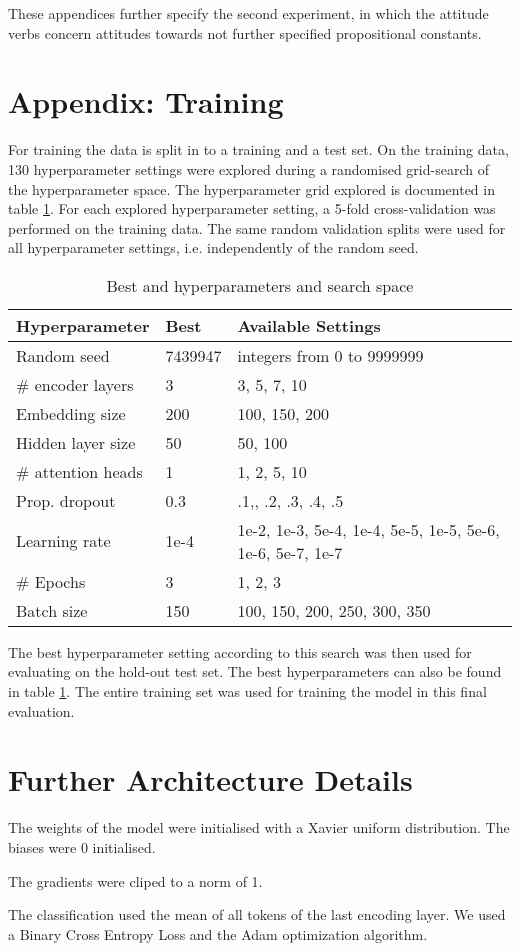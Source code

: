 \documentclass[a4paper]{article}
\begin{document}
These appendices further specify the second experiment, in which the
attitude verbs concern attitudes towards not further specified
propositional constants.


\section{Appendix: Training}

For training the data is split in to a training and a test set. On the training data, 130 hyperparameter settings were explored during a randomised grid-search of the hyperparameter space. The hyperparameter grid explored is documented in table \ref{tab:hyperparameter_space}. For each explored hyperparameter setting, a 5-fold cross-validation was performed on the training data. The same random validation splits were used for all hyperparameter settings, i.e. independently of the random seed.

\begin{table}[]
    \centering
    \begin{tabular}{lll}
       Hyperparameter  & Best & Available Settings  \\ \hline
       Random seed & 7439947 &  integers from 0 to 9999999 \\
       \# encoder layers & 3 & 3, 5, 7, 10 \\
       Embedding size & 200 & 100, 150, 200 \\
       Hidden layer size & 50  & 50, 100 \\
       \# attention heads & 1 & 1, 2, 5, 10 \\
       Prop. dropout & 0.3  & .1,, .2, .3, .4, .5 \\
       Learning rate & 1e-4& 1e-2, 1e-3, 5e-4, 1e-4, 5e-5, 1e-5, 5e-6, 1e-6, 5e-7, 1e-7 \\
       \# Epochs & 3 & 1, 2, 3 \\
       Batch size & 150 & 100, 150, 200, 250, 300, 350 \\
    \end{tabular}
    \caption{Best and hyperparameters and search space}
    \label{tab:hyperparameter_space}
\end{table}

The best hyperparameter setting according to this search was then used for evaluating on the hold-out test set. The best hyperparameters can also be found in table \ref{tab:hyperparameter_space}. The entire training set was used for training the model in this final evaluation.


\section{Further Architecture Details}

The weights of the model were initialised with a Xavier uniform
distribution. The biases were 0 initialised.

The gradients were cliped to a norm of 1.

The classification used the mean of all tokens of the last encoding
layer. We used a Binary Cross Entropy Loss and the Adam optimization algorithm.
\end{document}
